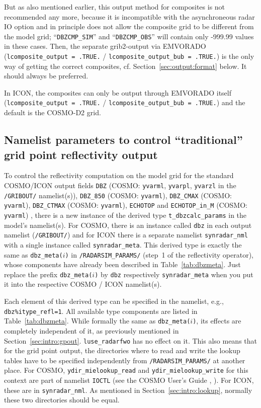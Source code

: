 \documentclass[10pt,a4paper,twoside,headinclude,footinclude,parskip=half]{scrartcl}
\newcommand{\myaktuellesection}{sec:intro}%
\newcommand{\labelsec}[1]{\label{#1}\renewcommand{\myaktuellesection}{#1}}%
\newcommand{\labelsec}[1]{\label{#1}}%
\newcommand{\citeNPK}[1]{\citeauthor{#1}, \citeyear{#1}}
\newcommand{\srcform}[1]{\mbox{\texttt{#1}}\xspace}%
\begin{document}
But as also mentioned earlier, this output method for composites is not recommended any more, because it is
incompatible with the asynchroneous radar IO option and in principle does not allow the composite grid to be
different from the model grid; ``\srcform{DBZCMP_SIM}'' and ``\srcform{DBZCMP_OBS}'' will contain
only -999.99 values in these cases. Then, the separate grib2-output via EMVORADO (\srcform{lcomposite_output = .TRUE.} / \srcform{lcomposite_output_bub = .TRUE.})
is the only way of getting the correct composites, cf. Section~\ref{sec:output:format} below.
It should always be preferred.

In ICON, the composites can only be output through EMVORADO itself (\srcform{lcomposite_output = .TRUE.} / \srcform{lcomposite_output_bub = .TRUE.}) and the default is the COSMO-D2 grid.


\newpage


\subsection{Namelist parameters to control ``traditional'' grid point reflectivity output}

\labelsec{sec:nml:gpout}

To control the reflectivity computation on the model grid for the standard
COSMO/ICON output fields \srcform{DBZ} (COSMO: \srcform{yvarml}, \srcform{yvarpl}, \srcform{yvarzl} in the \srcform{/GRIBOUT/} namelist(s)), \srcform{DBZ_850} (COSMO: \srcform{yvarml}), \srcform{DBZ_CMAX} (COSMO: \srcform{yvarml}), \srcform{DBZ_CTMAX} (COSMO: \srcform{yvarml}), \srcform{ECHOTOP} and \srcform{ECHOTOP_in_M} (COSMO: \srcform{yvarml})
, there is a new instance of the derived type \srcform{t_dbzcalc_params} in the model's namelist(s). For COSMO, there is an instance called \srcform{dbz} in each output namelist (\srcform{/GRIBOUT/}) and for ICON there is a separate namelist \srcform{synradar_nml} with a single instance called \srcform{synradar_meta}. This derived type is exactly the same
as \srcform{dbz_meta($i$)} in \srcform{/RADARSIM_PARAMS/} (step~1 of the reflectivity operator), whose components have already been described in Table~\ref{tab:dbzmeta}.
Just replace the prefix \srcform{dbz_meta($i$)} by \srcform{dbz} respectively \srcform{synradar_meta} when you put it into the respective COSMO / ICON namelist(s).

Each element of this derived type can be specified in the namelist, e.g., \srcform{dbz\%itype_refl=1}.
All available type components are listed in Table~\ref{tab:dbzmeta}. While formally the same as \srcform{dbz_meta($i$)},
its effects are completely independent of it, as previously mentioned in Section~\ref{sec:intro:gpout}. \srcform{luse_radarfwo} has no effect on it.
This also means that for the grid point output, the directories where to read and write the lookup tables have to be specified independently
from \srcform{/RADARSIM_PARAMS/} at another place. For COSMO, \srcform{ydir_mielookup_read} and \srcform{ydir_mielookup_write} for this context
are part of namelist \srcform{IOCTL} (see the COSMO User's Guide \citeNPK{schaettler2018}). For ICON, these are in \srcform{synradar_nml}.
As mentioned in Section~\ref{sec:intro:lookup}, normally these two directories should be equal.
\end{document}
